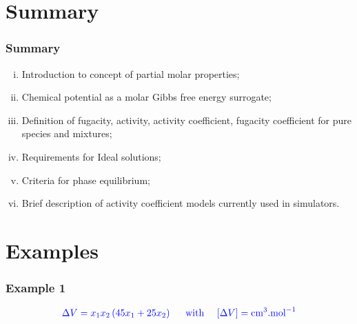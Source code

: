 \documentclass[10pt,compress,unknownkeysallowed]{beamer}
\begin{document}
\section{Summary}

\begin{frame}
 \frametitle{Summary}
   \begin{enumerate}[(i)]
      \item Introduction to concept of partial molar properties;
      \item Chemical potential as a molar Gibbs free energy surrogate;
      \item Definition of fugacity, activity, activity coefficient, fugacity coefficient for pure species and mixtures;
      \item Requirements for Ideal solutions;
      \item Criteria for phase equilibrium;
      \item Brief description of activity coefficient models currently used in simulators.
   \end{enumerate}
\end{frame}



\section{Examples}

\begin{frame}
 \frametitle{Example 1}\label{Ex1}
       \begin{displaymath}
          \textcolor{blue}{\Delta V = x_{1}x_{2}\left(45x_{1}+25x_{2}\right)\;\;\;\;\text{ with }\;\;\;\left[\Delta V\right] = \text{cm}^{3}.\text{mol}^{-1}}
       \end{displaymath}

\end{frame}
\end{document}
